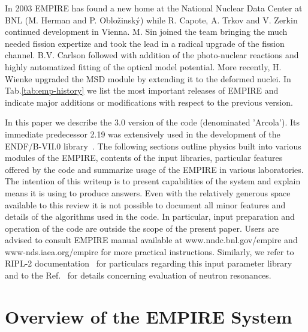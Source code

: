 In 2003 EMPIRE has found a new home at the National Nuclear Data Center at
BNL (M. Herman and P. Oblo\v zinsk\'y) while R. Capote, A. Trkov and V.
Zerkin continued development in Vienna. M. Sin joined the team bringing the
much needed fission expertize and took the lead in a radical upgrade of the
fission channel. B.V. Carlson followed with addition of the photo-nuclear
reactions and highly automatized fitting of the optical model potential.
More recently, H. Wienke upgraded the MSD module by extending it to the
deformed nuclei. In Tab.\ref{tab:emp-history} we list the most important
releases of EMPIRE and indicate major additions or modifications with
respect to the previous version.

In this paper we describe the 3.0 version of the code (denominated
'Arcola'). Its immediate predecessor 2.19 was extensively used in the
development of the ENDF/B-VII.0 library~\cite{ENDF-VII}. The following
sections outline physics built into various modules of the EMPIRE, contents
of the input libraries, particular features offered by the code and
summarize usage of the EMPIRE in various laboratories. The intention of this
writeup is to present capabilities of the system and explain means it is
using to produce answers. Even with the relatively generous space available
to this review it is not possible to document all minor features and details
of the algorithms used in the code. In particular, input preparation and
operation of the code are outside the scope of the present paper. Users are
advised to consult EMPIRE manual available at www.nndc.bnl.gov/empire and
www-nds.iaea.org/empire for more practical instructions. Similarly, we refer
to RIPL-2 documentation~\cite{RIPL2} for particulars regarding this input
parameter library and to the Ref.~\cite{Mughabghab:06} for details
concerning evaluation of neutron resonances.

\section{Overview of the EMPIRE System}

